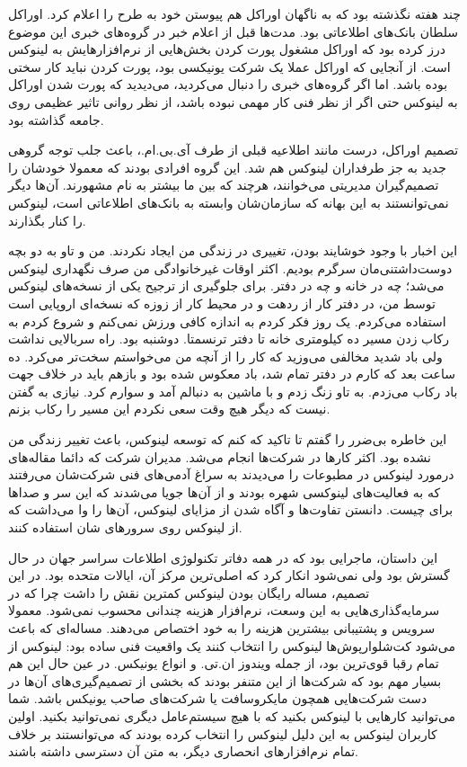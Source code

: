 چند هفته نگذشته بود که به ناگهان اوراکل هم پیوستن
خود به طرح را اعلام کرد. اوراکل سلطان بانک‌های اطلاعاتی بود. مدت‌ها قبل
از اعلام خبر در گروه‌های خبری این موضوع درز کرده بود که اوراکل مشغول
پورت کردن بخش‌هایی از نرم‌افزارهایش به لینوکس است. از آنجایی که اوراکل
عملا یک شرکت یونیکسی بود، پورت کردن نباید کار سختی بوده باشد. اما اگر
گروه‌های خبری را دنبال می‌کردید، می‌دیدید که پورت شدن اوراکل به لینوکس
حتی اگر از نظر فنی کار مهمی نبوده باشد، از نظر روانی تاثیر عظیمی روی
جامعه گذاشته بود.

تصمیم اوراکل، درست مانند اطلاعیه قبلی از طرف آی.بی.ام.، باعث جلب توجه
گروهی جدید به جز طرفداران لینوکس هم شد. این گروه افرادی بودند که معمولا
خودشان را تصمیم‌گیران مدیریتی می‌خوانند، هرچند که بین ما بیشتر به نام
 مشهورند. آن‌ها دیگر نمی‌توانستند به این بهانه که
سازمان‌شان وابسته به بانک‌های اطلاعاتی است، لینوکس را کنار بگذارند.

این اخبار با وجود خوشایند بودن، تغییری در زندگی من ایجاد نکردند. من و
تاو به دو بچه دوست‌داشتنی‌مان سرگرم بودیم. اکثر اوقات غیرخانوادگی من صرف
نگهداری لینوکس می‌شد؛ چه در خانه و چه در دفتر. برای جلوگیری از ترجیح
یکی از نسخه‌های لینوکس توسط من، در دفتر کار از ردهت و در محیط کار از
زوزه که نسخه‌ای اروپایی است استفاده می‌کردم. یک روز فکر کردم به اندازه
کافی ورزش نمی‌کنم و شروع کردم به رکاب زدن مسیر ده کیلومتری خانه تا دفتر
ترنسمتا. دوشنبه بود. راه سربالایی نداشت ولی باد شدید مخالفی می‌وزید که
کار را از آنچه من می‌خواستم سخت‌تر می‌کرد. ده ساعت بعد که کارم در دفتر
تمام شد، باد معکوس شده بود و بازهم باید در خلاف جهت باد رکاب می‌زدم. به
تاو زنگ زدم و با ماشین به دنبالم آمد و سوارم کرد. نیازی به گفتن نیست
که دیگر هیچ وقت سعی نکردم این مسیر را رکاب بزنم.

این خاطره بی‌ضرر را گفتم تا تاکید که کنم که توسعه لینوکس، باعث تغییر
زندگی من نشده بود. اکثر کارها در شرکت‌ها انجام می‌شد. مدیران شرکت که
دائما مقاله‌های درمورد لینوکس در مطبوعات را می‌دیدند به سراغ آدمی‌های فنی
شرکت‌شان می‌رفتند که به فعالیت‌های لینوکسی شهره بودند و از آن‌ها جویا
می‌شدند که این سر و صداها برای چیست. دانستن تفاوت‌ها و آگاه شدن از
مزایای لینوکس، آن‌ها را وا می‌داشت که از لینوکس روی سرورهای شان استفاده
کنند.

این داستان، ماجرایی بود که در همه دفاتر تکنولوژی اطلاعات سراسر جهان در
حال گسترش بود ولی نمی‌شود انکار کرد که اصلی‌ترین مرکز آن، ایالات متحده
بود. در این تصمیم، مساله رایگان بودن لینوکس کمترین نقش را داشت چرا که
در سرمایه‌گذاری‌هایی به این وسعت، نرم‌افزار هزینه چندانی محسوب
نمی‌شود. معمولا سرویس و پشتیبانی بیشترین هزینه را به خود اختصاص
می‌دهند. مساله‌ای که باعث می‌شود کت‌شلوارپوش‌ها لینوکس را انتخاب کنند یک
واقعیت فنی ساده بود: لینوکس از تمام رقبا قوی‌ترین بود، از جمله ویندوز
ان.تی. و انواع یونیکس. در عین حال این هم بسیار مهم بود که شرکت‌ها از
این متنفر بودند که بخشی از تصمیم‌گیری‌های آن‌ها در دست شرکت‌هایی همچون
مایکروسافت یا شرکت‌های صاحب یونیکس باشد. شما می‌توانید کارهایی با لینوکس
بکنید که با هیچ سیستم‌عامل دیگری نمی‌توانید بکنید. اولین کاربران لینوکس
به این دلیل لینوکس را انتخاب کرده بودند که می‌توانستند بر خلاف تمام
نرم‌افزارهای انحصاری دیگر، به متن آن دسترسی داشته باشند.

